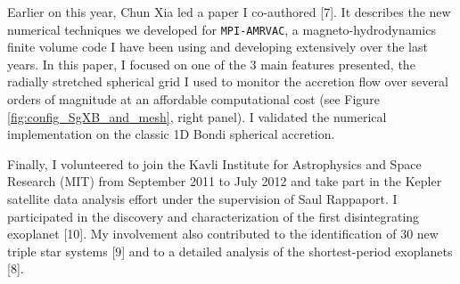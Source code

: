 \documentclass[letterpaper,12pt,onecolumn]{article}
\begin{document}
\normalsize

Earlier on this year, Chun Xia led a paper I co-authored [7]. It describes the new numerical techniques we developed for \texttt{MPI-AMRVAC}, a magneto-hydrodynamics finite volume code I have been using and developing extensively over the last years. In this paper, I focused on one of the 3 main features presented, the radially stretched spherical grid I used to monitor the accretion flow over several orders of magnitude at an affordable computational cost (see Figure\,\ref{fig:config_SgXB_and_mesh}, right panel). I validated the numerical implementation on the classic 1D Bondi spherical accretion.

Finally, I volunteered to join the Kavli Institute for Astrophysics and Space Research (MIT) from September 2011 to July 2012 and take part in the Kepler satellite data analysis effort under the supervision of Saul Rappaport. I participated in the discovery and characterization of the first disintegrating exoplanet [10]. My involvement also contributed to the identification of 30 new triple star systems [9] and to a detailed analysis of the shortest-period exoplanets [8].
\end{document}
